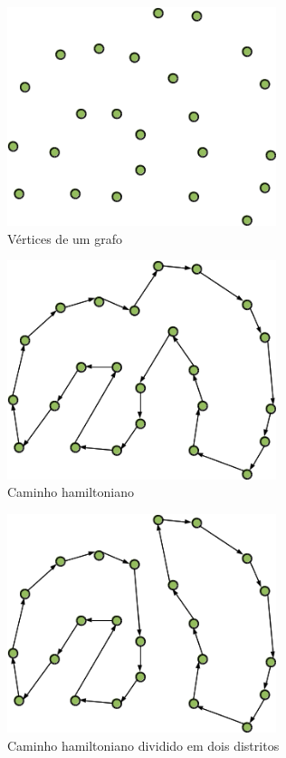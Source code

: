 \documentclass[12pt]{elsarticle}
\begin{document}
\begin{figure}[H]
\centering
\includegraphics[width=0.7\textwidth]{grafo.png}
\vspace{0.5cm}
\caption{\label{fig:proporcionalreaposta}Vértices de um grafo}
\end{figure}

\begin{figure}[H]
\centering
\includegraphics[width=0.7\textwidth]{grafo-distrito1.png}
\vspace{0.5cm}
\caption{\label{fig:proporcionalreaposta}Caminho hamiltoniano}
\end{figure}

\begin{figure}[H]
\centering
\includegraphics[width=0.7\textwidth]{grafo-distrito2.png}
\vspace{0.5cm}
\caption{\label{fig:proporcionalreaposta}Caminho hamiltoniano dividido em dois distritos}
\end{figure}
\end{document}
